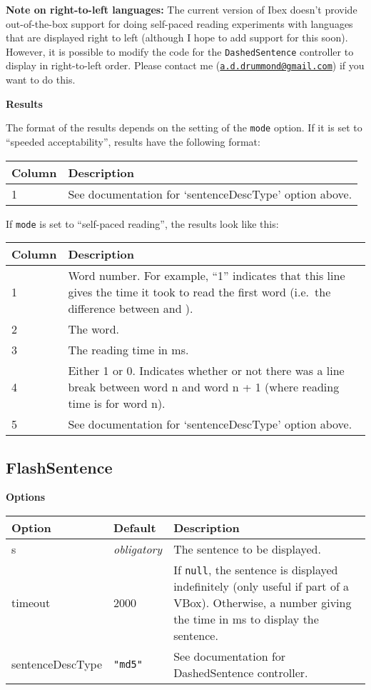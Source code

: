 \documentclass[]{article}
\begin{document}
\textbf{Note on right-to-left languages:} The current version of Ibex
doesn't provide out-of-the-box support for doing self-paced reading
experiments with languages that are displayed right to left (although I
hope to add support for this soon). However, it is possible to modify
the code for the \texttt{DashedSentence} controller to display in
right-to-left order. Please contact me
(\href{mailto:a.d.drummond@gmail.com}{\nolinkurl{a.d.drummond@gmail.com}})
if you want to do this.

\textbf{Results}

The format of the results depends on the setting of the \texttt{mode}
option. If it is set to ``speeded acceptability'', results have the
following format:

\begin{longtable}[c]{p{1in}p{5in}}
\toprule
\textbf{Column} & \textbf{Description}\tabularnewline
\midrule
\endhead
1 & See documentation for `sentenceDescType' option
above.\tabularnewline
\bottomrule
\end{longtable}

If \texttt{mode} is set to ``self-paced reading'', the results look like
this:

\begin{longtable}[c]{p{1in}p{5in}}
\toprule
\textbf{Column} & \textbf{Description}\tabularnewline
\midrule
\endhead
1 & Word number. For example, ``1'' indicates that this line gives the
time it took to read the first word (i.e.~the difference between and
).\tabularnewline
2 & The word.\tabularnewline
3 & The reading time in ms.\tabularnewline
4 & Either 1 or 0. Indicates whether or not there was a line break
between word n and word n + 1 (where reading time is for word
n).\tabularnewline
5 & See documentation for `sentenceDescType' option
above.\tabularnewline
\bottomrule
\end{longtable}

\subsection{FlashSentence}\label{flashsentence}

\textbf{Options}

\begin{longtable}[c]{p{1in}p{1in}p{3.85in}}
\toprule
\textbf{Option} & \textbf{Default} & \textbf{Description}\tabularnewline
\midrule
\endhead
s & \emph{obligatory} & The sentence to be displayed.\tabularnewline
timeout & 2000 & If \texttt{null}, the sentence is displayed
indefinitely (only useful if part of a VBox). Otherwise, a number giving
the time in ms to display the sentence.\tabularnewline
sentenceDescType & \texttt{"md5"} & See documentation for DashedSentence
controller.\tabularnewline
\bottomrule
\end{longtable}
\end{document}
